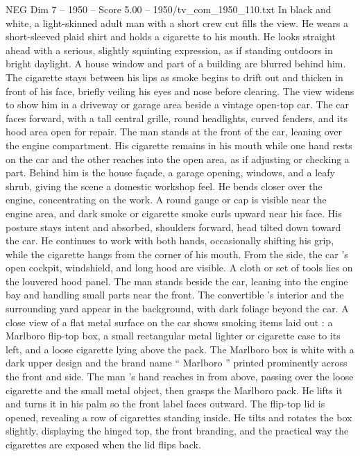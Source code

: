 \begin{textsample}{NEG Dim 7 – 1950 – Score 5.00 – 1950/tv\_com\_1950\_110.txt}  \label{ex:f7_neg_089}
In black and white, a light-skinned adult man with a short crew cut fills the view.
He wears a short-sleeved plaid shirt and holds a cigarette to his mouth.
He looks straight ahead with a serious, slightly squinting expression, as if standing outdoors in bright daylight.
A house window and part of a building are blurred behind him.
The cigarette stays between his lips as smoke begins to drift out and thicken in front of his face, briefly veiling his eyes and nose before clearing.
The view widens to show him in a driveway or garage area beside a vintage open-top car.
The car faces forward, with a tall central grille, round headlights, curved fenders, and its hood area open for repair.
The man stands at the front of the car, leaning over the engine compartment.
His cigarette remains in his mouth while one hand rests on the car and the other reaches into the open area, as if adjusting or checking a part.
Behind him is the house façade, a garage opening, windows, and a leafy shrub, giving the scene a domestic workshop feel.
He bends closer over the engine, concentrating on the work.
A round gauge or cap is visible near the engine area, and dark smoke or cigarette smoke curls upward near his face.
His posture stays intent and absorbed, shoulders forward, head tilted down toward the car.
He continues to work with both hands, occasionally shifting his grip, while the cigarette hangs from the corner of his mouth.
From the side, the car ’s open cockpit, windshield, and long hood are visible.
A cloth or set of tools lies on the louvered hood panel.
The man stands beside the car, leaning into the engine bay and handling small parts near the front.
The convertible ’s interior and the surrounding yard appear in the background, with dark foliage beyond the car.
A close view of a flat metal surface on the car shows smoking items laid out : a Marlboro flip-top box, a small rectangular metal lighter or cigarette case to its left, and a loose cigarette lying above the pack.
The Marlboro box is white with a dark upper design and the brand name “ Marlboro ” printed prominently across the front and side.
The man ’s hand reaches in from above, passing over the loose cigarette and the small metal object, then grasps the Marlboro pack.
He lifts it and turns it in his palm so the front label faces outward.
The flip-top lid is opened, revealing a row of cigarettes standing inside.
He tilts and rotates the box slightly, displaying the hinged top, the front branding, and the practical way the cigarettes are exposed when the lid flips back.

\end{textsample}
